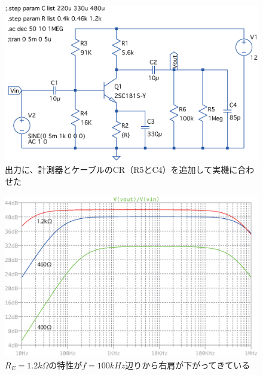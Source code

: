 \documentclass[uplatex,a4paper,11pt,oneside,openany]{jsbook}
\begin{document}
    \begin{figure}[H]
       \centering
        \includegraphics[keepaspectratio, scale=0.65, angle=0]
                    {figs/eps/kyokasyoM1Y.eps}
                    \caption{出力に、計測器とケーブルのCR（R5とC4）を追加して実機に合わせた}
                    \label{fig:spice3}
    \end{figure}
  
    \begin{figure}[H]
       \centering
        \includegraphics[keepaspectratio, scale=0.65, angle=0]
                  {figs/eps/_kyokasyoM1YFrqs.eps}
                  \caption{$R_E=1.2k\Omega$の特性が$f=100kHz$辺りから右肩が下がってきている}
                  \label{fig:spice4}
    \end{figure}
\end{document}
